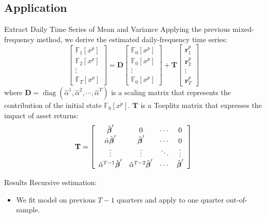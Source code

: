 \documentclass[UTF8, 10pt]{beamer}
\begin{document}
\begin{CJK*}{UTF8}{gbsn}
\section{Application}
\begin{frame}{Extract Daily Time Series of Mean and Variance}
	Applying the previous mixed-frequency method, we derive the estimated daily-frequency time series:
			$$
			\left[\begin{array}{c}\mathbb{F}_{1}\left[x^{p}\right] \\ \mathbb{F}_{2}\left[x^{p}\right] \\ \vdots \\ \mathbb{F}_{T}\left[x^{p}\right]\end{array}\right]=\mathbf{D}\left[\begin{array}{c}\mathbb{F}_{0}\left[x^{p}\right] \\ \mathbb{F}_{0}\left[x^{p}\right] \\ \vdots \\ \mathbb{F}_{0}\left[x^{p}\right]\end{array}\right]+\mathbf{T}\left[\begin{array}{c}\mathbf{r}_{1}^{p} \\ \mathbf{r}_{2}^{p} \\ \vdots \\ \mathbf{r}_{T}^{p}\end{array}\right]
			$$
	where $\mathbf{D}=\operatorname{diag}\left(\hat{\alpha}^{1}, \hat{\alpha}^{2}, \cdots, \hat{\alpha}^{T}\right)$ is a scaling matrix that represents the contribution of the initial state $\mathbb{F}_{0}\left[x^{p}\right]$.
	$\mathbf{T}$ is a Toeplitz matrix that expresses the impact of asset returns:
	$$
	\mathbf{T}=\left[\begin{array}{c c c c}\hat{\boldsymbol{\beta}}^{\prime} & 0 & \cdots & 0 \\ \hat{\alpha} \hat{\boldsymbol{\beta}}^{\prime} & \hat{\boldsymbol{\beta}}^{\prime} & \cdots & 0 \\ \vdots & \vdots & \ddots & \vdots \\ \hat{\alpha}^{T-1} \hat{\boldsymbol{\beta}}^{\prime} & \hat{\alpha}^{T-2} \hat{\boldsymbol{\beta}}^{\prime} & \cdots & \hat{\boldsymbol{\beta}}^{\prime}\end{array}\right]
	$$
\end{frame}
\begin{frame}{Results}
	Recursive estimation:
	\begin{itemize}
		\item We fit model on previous $T-1$ quarters and apply to one quarter out-of-sample.

\end{itemize}
\end{frame}
\end{CJK*}
\end{document}
